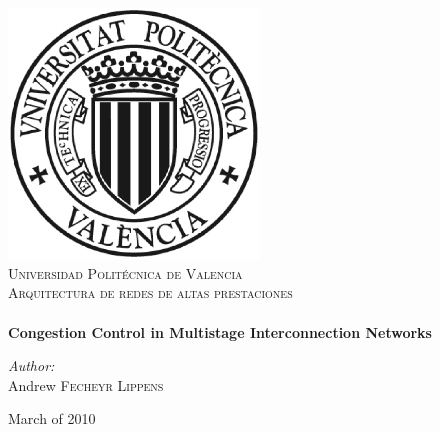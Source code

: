 \begin{titlepage}
\begin{center}
 
\includegraphics[width=0.50\textwidth]{logoUPV.eps}\\[1cm]
\textsc{\LARGE Universidad Polit\'ecnica de Valencia}\\[1.4cm]
\textsc{\Large Arquitectura de redes de altas prestaciones}\\[1.4cm]
 
 
\HRule \\[0.4cm]
{ \huge \bfseries Congestion Control in Multistage Interconnection Networks}
\HRule \\[1.4cm]
 
\begin{flushleft} \large
\emph{Author:}\\
Andrew \textsc{Fecheyr} \textsc{Lippens}
\end{flushleft}

\vfill
 
{\large March of 2010}
 
\end{center}
\end{titlepage}